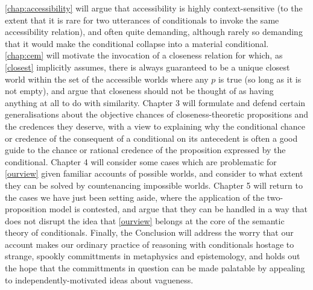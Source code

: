 \documentclass[If.tex]{subfiles}
\begin{document}
\autoref{chap:accessibility} will argue that accessibility is highly context-sensitive (to the extent that it is rare for two utterances of conditionals to invoke the same accessibility relation), and often quite demanding, although rarely so demanding that it would make the conditional collapse into a material conditional.  \autoref{chap:cem} will motivate the invocation of a closeness relation for which, as \ref{closest} implicitly assumes, there is always guaranteed to be a unique closest world within the set of the accessible worlds where any $p$ is true (so long as it is not empty), and argue that closeness should not be thought of as having anything at all to do with similarity.  Chapter 3 will formulate and defend certain generalisations about the objective chances of closeness-theoretic propositions and the credences they deserve, with a view to explaining why the conditional chance or credence of the consequent of a conditional on its antecedent is often a good guide to the chance or rational credence of the proposition expressed by the conditional.  Chapter 4 will consider some cases which are problematic for \ref{ourview} given familiar accounts of possible worlds, and consider to what extent they can be solved by countenancing impossible worlds.  Chapter 5 will return to the cases we have just been setting aside, where the application of the two-proposition model is contested, and argue that they can be handled in a way that does not disrupt the idea that \ref{ourview} belongs at the core of the semantic theory of conditionals.  Finally, the Conclusion will address the worry that our account makes our ordinary practice of reasoning with conditionals hostage to strange, spookly committments in metaphysics and epistemology, and holds out the hope that the committments in question can be made palatable by appealing to independently-motivated ideas about vagueness.  
\end{document}
